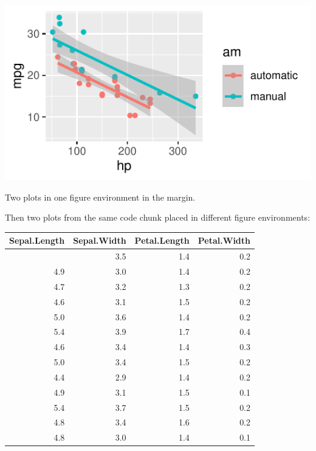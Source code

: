 \documentclass[
  letterpaper,
  DIV=11,
  numbers=noendperiod,
  oneside]{scrartcl}
\begin{document}
\begin{marginfigure}

{\centering \includegraphics{HousePrices_files/figure-pdf/fig-margin-together-2.pdf}

}

\caption{\label{fig-margin-together-2}Two plots in one figure
environment in the margin.}

\end{marginfigure}

Then two plots from the same code chunk placed in different figure
environments:

\begin{longtable}[]{@{}rrrr@{}}
\toprule\noalign{}
Sepal.Length & Sepal.Width & Petal.Length & Petal.Width \\
\midrule\noalign{}
\endhead
\bottomrule\noalign{}
\endlastfoot
5.1 & 3.5 & 1.4 & 0.2 \\
4.9 & 3.0 & 1.4 & 0.2 \\
4.7 & 3.2 & 1.3 & 0.2 \\
4.6 & 3.1 & 1.5 & 0.2 \\
5.0 & 3.6 & 1.4 & 0.2 \\
5.4 & 3.9 & 1.7 & 0.4 \\
4.6 & 3.4 & 1.4 & 0.3 \\
5.0 & 3.4 & 1.5 & 0.2 \\
4.4 & 2.9 & 1.4 & 0.2 \\
4.9 & 3.1 & 1.5 & 0.1 \\
5.4 & 3.7 & 1.5 & 0.2 \\
4.8 & 3.4 & 1.6 & 0.2 \\
4.8 & 3.0 & 1.4 & 0.1 \\
\end{longtable}
\end{document}
